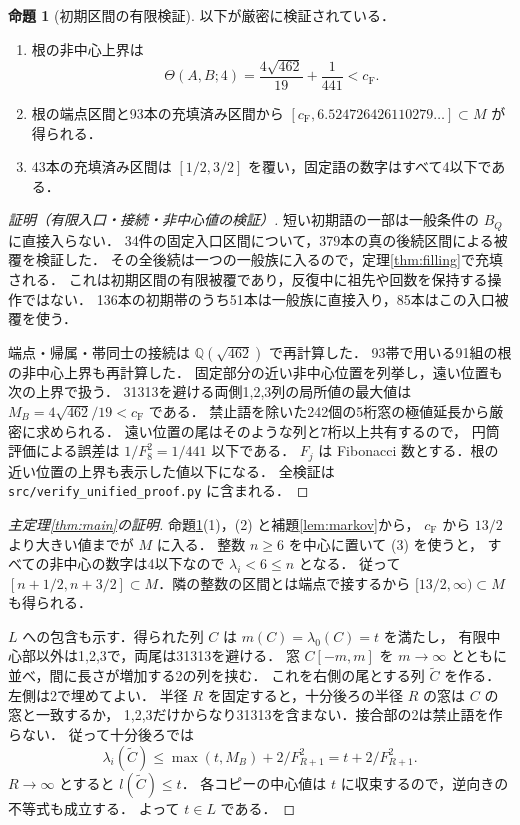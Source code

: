 \documentclass[10pt,a4paper]{article}
\theoremstyle{definition}
\newtheorem{proposition}{命題}
\newcommand{\CF}{c_{\mathrm F}}
\newcommand{\file}[1]{{\small\nolinkurl{#1}}}
\begin{document}
\begin{proposition}[初期区間の有限検証]\label{prop:initial}
以下が厳密に検証されている．
\begin{enumerate}
\item 根の非中心上界は
\[
 \Theta(A,B;4)=\frac{4\sqrt{462}}{19}+\frac1{441}<\CF.
\]
\item 根の端点区間と93本の充填済み区間から
$[\CF,6.524726426110279\ldots]\subset M$ が得られる．
\item 43本の充填済み区間は $[1/2,3/2]$ を覆い，固定語の数字はすべて4以下である．
\end{enumerate}
\end{proposition}
\begin{proof}[証明（有限入口・接続・非中心値の検証）]
短い初期語の一部は一般条件の $B_Q$ に直接入らない．
34件の固定入口区間について，379本の真の後続区間による被覆を検証した．
その全後続は一つの一般族に入るので，定理\ref{thm:filling}で充填される．
これは初期区間の有限被覆であり，反復中に祖先や回数を保持する操作ではない．
136本の初期帯のうち51本は一般族に直接入り，85本はこの入口被覆を使う．

端点・帰属・帯同士の接続は $\mathbb Q(\sqrt{462})$ で再計算した．
93帯で用いる91組の根の非中心上界も再計算した．
固定部分の近い非中心位置を列挙し，遠い位置も次の上界で扱う．
31313を避ける両側1,2,3列の局所値の最大値は
$M_B=4\sqrt{462}/19<\CF$ である．
禁止語を除いた242個の5桁窓の極値延長から厳密に求められる．
遠い位置の尾はそのような列と7桁以上共有するので，
円筒評価による誤差は $1/F_8^2=1/441$ 以下である．
$F_j$ は Fibonacci 数とする．根の近い位置の上界も表示した値以下になる．
全検証は \file{src/verify_unified_proof.py} に含まれる．
\end{proof}

\begin{proof}[主定理\ref{thm:main}の証明]
命題\ref{prop:initial}(1)，(2) と補題\ref{lem:markov}から，
$\CF$ から $13/2$ より大きい値までが $M$ に入る．
整数 $n\ge6$ を中心に置いて (3) を使うと，
すべての非中心の数字は4以下なので $\lambda_i<6\le n$ となる．
従って $[n+1/2,n+3/2]\subset M$．隣の整数の区間とは端点で接するから
$[13/2,\infty)\subset M$ も得られる．

$L$ への包含も示す．得られた列 $C$ は $m(C)=\lambda_0(C)=t$ を満たし，
有限中心部以外は1,2,3で，両尾は31313を避ける．
窓 $C[-m,m]$ を $m\to\infty$ とともに並べ，間に長さが増加する2の列を挟む．
これを右側の尾とする列 $\widetilde C$ を作る．左側は2で埋めてよい．
半径 $R$ を固定すると，十分後ろの半径 $R$ の窓は $C$ の窓と一致するか，
1,2,3だけからなり31313を含まない．接合部の2は禁止語を作らない．
従って十分後ろでは
\[
 \lambda_i(\widetilde C)\le\max(t,M_B)+2/F_{R+1}^2
                         =t+2/F_{R+1}^2.
\]
$R\to\infty$ とすると $l(\widetilde C)\le t$．
各コピーの中心値は $t$ に収束するので，逆向きの不等式も成立する．
よって $t\in L$ である．
\end{proof}
\end{document}
